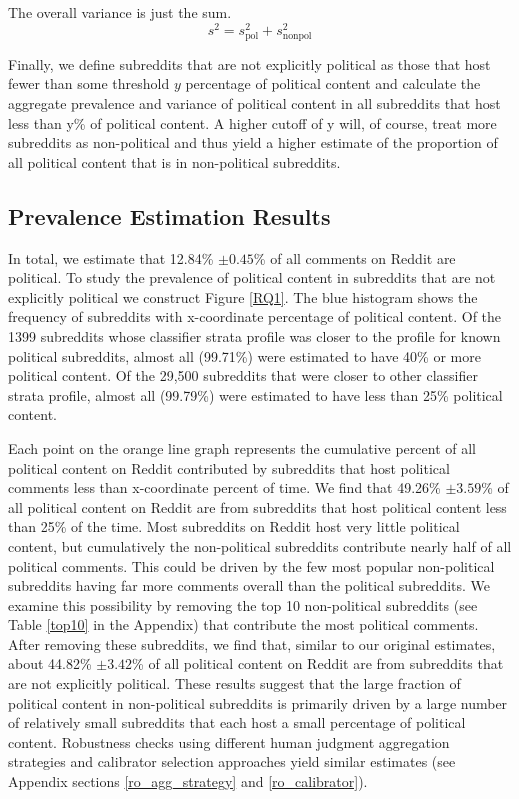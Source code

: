 \documentclass[letterpaper]{article} %
\begin{document}
The overall variance is just the sum.
\begin{displaymath}
s^2 = s^2_{\textrm{pol}} + s^2_{\textrm{nonpol}} 
\end{displaymath}



Finally, we define subreddits that are not explicitly political as those that host fewer than some threshold $y$ percentage of political content and calculate the aggregate prevalence and variance of political content in all subreddits that host less than y\% of political content. A higher cutoff of y will, of course, treat more subreddits as non-political and thus yield a higher estimate of the proportion of all political content that is in non-political subreddits. 

\subsection{Prevalence Estimation Results}\label{estimation_results}
In total, we estimate that 12.84\% $\pm 0.45$\%  of all comments on Reddit are political. To study the prevalence of political content in subreddits that are not explicitly political we construct Figure \ref{RQ1}. The blue histogram shows the frequency of subreddits with x-coordinate percentage of political content. Of the 1399 subreddits whose classifier strata profile was closer to the profile for known political subreddits, almost all (99.71\%) were estimated to have 40\% or more political content. 
Of the 29,500 subreddits that were closer to other classifier strata profile, almost all (99.79\%) were estimated to have less than 25\% political content.

Each point on the orange line graph represents the cumulative percent of all political content on Reddit contributed by subreddits that host political comments less than x-coordinate percent of time. We find that 49.26\% $\pm 3.59$\% of all political content on Reddit are from subreddits that host political content less than 25\% of the time. 
Most subreddits on Reddit host very little political content, but cumulatively the non-political subreddits contribute nearly half of all political comments. This could be driven by the few most popular non-political subreddits having far more comments overall than the political subreddits. We examine this possibility by removing the top 10 non-political subreddits (see Table \ref{top10} in the Appendix) that contribute the most political comments. After removing these subreddits, we find that, similar to our original estimates, about 44.82\% $\pm 3.42$\% of all political content on Reddit are from subreddits that are not explicitly political. These results suggest that the large fraction of political content in non-political subreddits is primarily driven by a large number of relatively small subreddits that each host a small percentage of political content. Robustness checks using different human judgment aggregation strategies and calibrator selection approaches yield similar estimates (see Appendix sections \ref{ro_agg_strategy} and \ref{ro_calibrator}).
\end{document}
